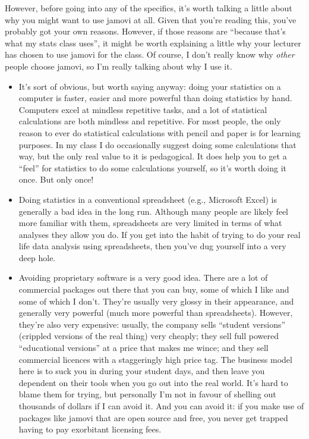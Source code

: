 However, before going into any of the specifics, it's worth talking a little about why you might want to use jamovi at all. Given that you're reading this, you've probably got your own reasons. However, if those reasons are ``because that's what my stats class uses'', it might be worth explaining a little why your lecturer has chosen to use jamovi for the class. Of course, I don't really know why {\it other} people choose jamovi, so I'm really talking about why I use it.
\begin{itemize}
\item It's sort of obvious, but worth saying anyway: doing your statistics on a computer is faster, easier and more powerful than doing statistics by hand. Computers excel at mindless repetitive tasks, and a lot of statistical calculations are both mindless and repetitive. For most people, the only reason to ever do statistical calculations with pencil and paper is for learning purposes. In my class I do occasionally suggest doing some calculations that way, but the only real value to it is pedagogical. It does help you to get a ``feel'' for statistics to do some calculations yourself, so it's worth doing it once. But only once!
\item Doing statistics in a conventional spreadsheet (e.g., Microsoft Excel) is generally a bad idea in the long run. Although many people are likely feel more familiar with them, spreadsheets are very limited in terms of what analyses they allow you do. If you get into the habit of trying to do your real life data analysis using spreadsheets, then you've dug yourself into a very deep hole.
\item Avoiding proprietary software is a very good idea. There are a lot of commercial packages out there that you can buy, some of which I like and some of which I don't. They're usually very glossy in their appearance, and generally very powerful (much more powerful than spreadsheets). However, they're also very expensive: usually, the company sells ``student versions'' (crippled versions of the real thing) very cheaply; they sell full powered ``educational versions'' at a price that makes me wince; and they sell commercial licences with a staggeringly high price tag. The business model here is to suck you in during your student days, and then leave you dependent on their tools when you go out into the real world. It's hard to blame them for trying, but personally I'm not in favour of shelling out thousands of dollars if I can avoid it. And you can avoid it: if you make use of packages like jamovi that are open source and free, you never get trapped having to pay exorbitant licensing fees. 

\end{itemize}
